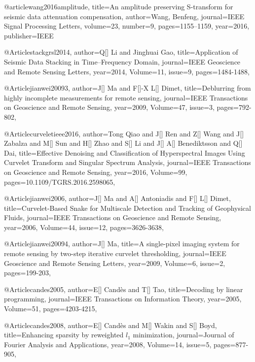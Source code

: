 @article{wang2016amplitude,
  title={An amplitude preserving S-transform for seismic data attenuation compensation},
  author={Wang, Benfeng},
  journal={IEEE Signal Processing Letters},
  volume={23},
  number={9},
  pages={1155--1159},
  year={2016},
  publisher={IEEE}
}

 @Article{stackgrsl2014,
  author={Q[] Li and Jinghuai Gao},
  title={Application of Seismic Data Stacking in Time–Frequency Domain},
  journal={IEEE Geoscience and Remote Sensing Letters},
  year=2014,
  Volume=11,
  issue=9,
  pages={1484-1488},
}





@Article{jianwei20093,
  author={J[] Ma and F[]-X L[] Dimet},
  title={Deblurring from highly incomplete measurements for remote sensing},
  journal={IEEE Transactions on Geoscience and Remote Sensing},
  year=2009,
  Volume=47,
  issue=3,
  pages={792-802},
}

@Article{curveletieee2016,
  author={Tong Qiao and J[] Ren and Z[] Wang and J[] Zabalza and M[] Sun and H[] Zhao and S[] Li and J[] A[] Benediktsson and Q[] Dai},
  title={Effective Denoising and Classification of Hyperspectral Images Using Curvelet Transform and Singular Spectrum Analysis},
  journal={IEEE Transactions on Geoscience and Remote Sensing},
  year=2016,
  Volume=99,
  pages={10.1109/TGRS.2016.2598065},
}



@Article{jianwei2006,
  author={J[] Ma and A[] Antoniadis and F[] L[] Dimet},
  title={Curvelet-Based Snake for Multiscale Detection and Tracking of Geophysical Fluids},
  journal={IEEE Transactions on Geoscience and Remote Sensing},
  year=2006,
  Volume=44,
  issue=12,
  pages={3626-3638},
}

@Article{jianwei20094,
  author={J[] Ma},
  title={A single-pixel imaging system for remote sensing by two-step iterative curvelet
thresholding},
  journal={IEEE Geoscience and Remote Sensing Letters},
  year=2009,
  Volume=6,
  issue=2,
  pages={199-203},
}

@Article{candes2005,
  author={E[] Cand\`{e}s and T[] Tao},
  title={Decoding by linear programming},
  journal={IEEE Transactions on Information Theory},
  year=2005,
  Volume=51,
  pages={4203-4215},
}

@Article{candes2008,
  author={E[] Cand\`{e}s and M[] Wakin and S[] Boyd},
  title={Enhancing sparsity by reweighted $l_1$ minimization},
  journal={Journal of {F}ourier Analysis and Applications},
  year=2008,
  Volume=14,
  issue=5,
  pages={877-905},
}

